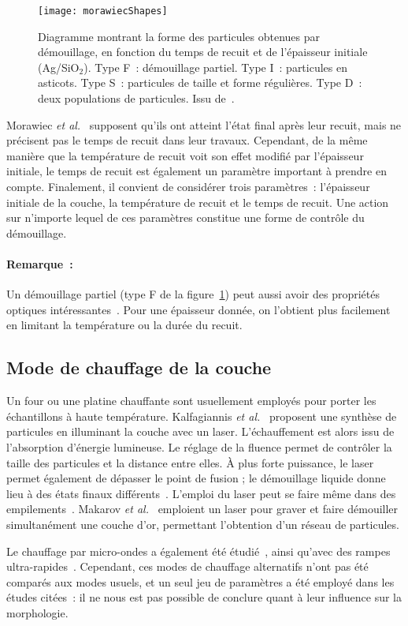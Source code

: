 \begin{figure}[!p]
	\centering
	\texttt{[image: morawiecShapes]}
	\caption{Diagramme montrant la forme des particules obtenues par démouillage, en fonction du temps de recuit et de l'épaisseur initiale (Ag/SiO$_2$). Type F~: démouillage partiel. Type I~: particules en asticots. Type S~: particules de taille et forme régulières. Type D~: deux populations de particules. Issu de~\cite{morawiec2013self}.}
	\label{morawiecShapes}
\end{figure} 
Morawiec \textit{et al.}~\cite{morawiec2013self} supposent qu'ils ont atteint l'état final après leur recuit, mais ne précisent pas le temps de recuit dans leur travaux. Cependant, de la même manière que la température de recuit voit son effet modifié par l'épaisseur initiale, le temps de recuit est également un paramètre important à prendre en compte. Finalement, il convient de considérer trois paramètres~: l'épaisseur initiale de la couche, la température de recuit et le temps de recuit. Une action sur n'importe lequel de ces paramètres constitue une forme de contrôle du démouillage.\par 

\paragraph*{Remarque~:} Un démouillage partiel (type F de la figure~\ref{morawiecShapes}) peut aussi avoir des propriétés optiques intéressantes~\cite{morawiec2013self, kunwar2016ag}. Pour une épaisseur donnée, on l'obtient plus facilement en limitant la température ou la durée du recuit.\par 

	\subsection{Mode de chauffage de la couche}
Un four ou une platine chauffante sont usuellement employés pour porter les échantillons à haute température. Kalfagiannis \textit{et al.}~\cite{kalfagiannis2016selective} proposent une synthèse de particules en illuminant la couche avec un laser. L'échauffement est alors issu de l'absorption d'énergie lumineuse. Le réglage de la fluence permet de contrôler la taille des particules et la distance entre elles. À plus forte puissance, le laser permet également de dépasser le point de fusion ; le démouillage liquide donne lieu à des états finaux différents~\cite{trice2007pulsed}. L'emploi du laser peut se faire même dans des empilements~\cite{siozios2015sub}. Makarov \textit{et al.}~\cite{makarov2016controllable} emploient un laser pour graver et faire démouiller simultanément une couche d'or, permettant l'obtention d'un réseau de particules.\par 
Le chauffage par micro-ondes a également été étudié~\cite{panagiotopoulos2015self}, ainsi qu'avec des rampes ultra-rapides~\cite{yu2016structural}. Cependant, ces modes de chauffage alternatifs n'ont pas été comparés aux modes usuels, et un seul jeu de paramètres a été employé dans les études citées~: il ne nous est pas possible de conclure quant à leur influence sur la morphologie.\par 

